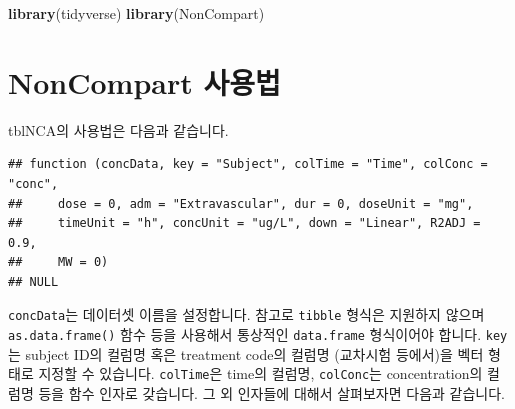 \documentclass[12pt,]{krantz}
\newenvironment{Shaded}{\begin{snugshade}}{\end{snugshade}}
\newcommand{\KeywordTok}[1]{\textcolor[rgb]{0.13,0.29,0.53}{\textbf{#1}}}
\newcommand{\NormalTok}[1]{#1}
\begin{document}
\begin{Shaded}
\begin{Highlighting}[]
\KeywordTok{library}\NormalTok{(tidyverse)}
\KeywordTok{library}\NormalTok{(NonCompart)}
\end{Highlighting}
\end{Shaded}

\hypertarget{how-to-use}{%
\section{NonCompart 사용법}\label{how-to-use}}

tblNCA의 사용법은 다음과 같습니다.

\begin{verbatim}
## function (concData, key = "Subject", colTime = "Time", colConc = "conc", 
##     dose = 0, adm = "Extravascular", dur = 0, doseUnit = "mg", 
##     timeUnit = "h", concUnit = "ug/L", down = "Linear", R2ADJ = 0.9, 
##     MW = 0) 
## NULL
\end{verbatim}

\texttt{concData}는 데이터셋 이름을 설정합니다. 참고로 \texttt{tibble} 형식은 지원하지 않으며 \texttt{as.data.frame()} 함수 등을 사용해서 통상적인 \texttt{data.frame} 형식이어야 합니다.
\texttt{key}는 subject ID의 컬럼명 혹은 treatment code의 컬럼명 (교차시험 등에서)을 벡터 형태로 지정할 수 있습니다.
\texttt{colTime}은 time의 컬럼명, \texttt{colConc}는 concentration의 컬럼명 등을 함수 인자로 갖습니다. 그 외 인자들에 대해서 살펴보자면 다음과 같습니다.
\end{document}
